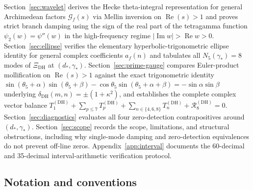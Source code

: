 \documentclass[11pt,reqno]{amsart}
\theoremstyle{definition}
\theoremstyle{remark}
\numberwithin{equation}{section}
\DeclareMathOperator{\Reop}{Re}
\DeclareMathOperator{\Imop}{Im}
\begin{document}
Section~\ref{sec:wavelet} derives the Hecke theta-integral representation for general Archimedean factors $\mathcal{G}_f(s)$ via Mellin inversion on $\Reop(s) > 1$ and proves strict branch damping using the sign of the real part of the tetragamma function $\psi_2(w) = \psi''(w)$ in the high-frequency regime $|\Imop w| > \Reop w > 0$. Section~\ref{sec:ellipse} verifies the elementary hyperbolic-trigonometric ellipse identity for general complex coefficients $a_f(n)$ and tabulates all $N_5(\gamma_*) = 8$ modes of $\Xi_{\mathrm{DH}}$ at $(d_*,\gamma_*)$. Section~\ref{sec:prime-gauge} compares Euler-product mollification on $\Reop(s) > 1$ against the exact trigonometric identity $\sin(\theta_5 + \alpha)\sin(\theta_5 + \beta) - \cos\theta_5\sin(\theta_5 + \alpha + \beta) = -\sin\alpha\sin\beta$ underlying $\delta_{\mathrm{DH}}(m,n) = \pm(1+\kappa^2)$, and establishes the complete complex vector balance $T_1^{(\mathrm{DH})} + \sum_{p\le 7}T_p^{(\mathrm{DH})} + \sum_{n\in\{4,6,8\}}T_n^{(\mathrm{DH})} + \mathcal{R}_8^{(\mathrm{DH})} = 0$. Section~\ref{sec:diagnostics} evaluates all four zero-detection contrapositives around $(d_*,\gamma_*)$. Section~\ref{sec:scope} records the scope, limitations, and structural obstructions, including why single-mode damping and zero-detection equivalences do not prevent off-line zeros. Appendix~\ref{app:interval} documents the 60-decimal and 35-decimal interval-arithmetic verification protocol.

\subsection{Notation and conventions}
\label{subsec:notation}
\end{document}
